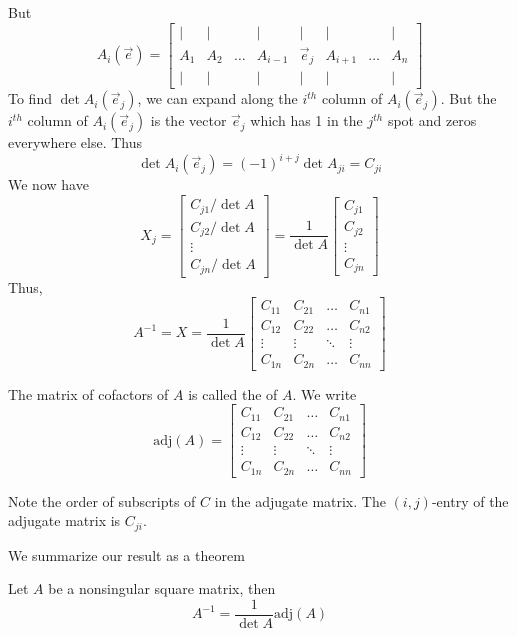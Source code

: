 \documentclass{ximera}
\begin{document}
But
$$A_i(\vec{e})=\begin{bmatrix}
           | & |& &|&|&|&&|\\
		A_1 & A_2&\dots &A_{i-1}&\vec{e}_j&A_{i+1}&\dots&A_n\\
		| & |& &|&|&|&&|
         \end{bmatrix}$$
To find $\det{A_i(\vec{e}_j)}$, we can expand along the $i^{th}$ column of $A_i(\vec{e}_j)$.  But the $i^{th}$ column of $A_i(\vec{e}_j)$ is the vector $\vec{e}_j$ which has 1 in the $j^{th}$ spot and zeros everywhere else.  Thus 
$$\det{A_i(\vec{e}_j)}=(-1)^{i+j}\det{A_{ji}}=C_{ji}$$
We now have
$$X_j=\begin{bmatrix}C_{j1}/\det{A}\\C_{j2}/\det{A}\\\vdots\\C_{jn}/\det{A}\end{bmatrix}=\frac{1}{\det{A}}\begin{bmatrix}C_{j1}\\C_{j2}\\\vdots\\C_{jn}\end{bmatrix}$$
Thus,
$$A^{-1}=X=\frac{1}{\det{A}}\begin{bmatrix}C_{11}&C_{21}&\ldots&C_{n1}\\C_{12}&C_{22}&\ldots&C_{n2}\\\vdots&\vdots&\ddots&\vdots\\
C_{1n}&C_{2n}&\ldots&C_{nn}\end{bmatrix}$$

The matrix of cofactors of $A$ is called the  of $A$.  We write
$$\text{adj}(A)=\begin{bmatrix}C_{11}&C_{21}&\ldots&C_{n1}\\C_{12}&C_{22}&\ldots&C_{n2}\\\vdots&\vdots&\ddots&\vdots\\
C_{1n}&C_{2n}&\ldots&C_{nn}\end{bmatrix}$$

\begin{warning}
Note the order of subscripts of $C$ in the adjugate matrix.  The $(i,j)$-entry of the adjugate matrix is $C_{ji}$.
\end{warning}

We summarize our result as a theorem 

\begin{theorem}\label{th:adjugateinverseformula}
Let $A$ be a nonsingular square matrix, then
$$A^{-1}=\frac{1}{\det{A}}\mbox{adj}(A)$$
\end{theorem}
\end{document}
